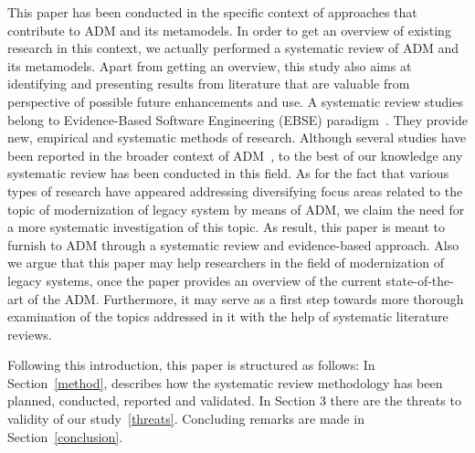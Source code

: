 This paper has been conducted in the specific context of approaches that contribute to ADM and its metamodels. In order to get an overview of existing research in this context, we actually performed a systematic review of ADM and its metamodels. Apart from getting an overview, this study also aims at identifying and presenting results from literature that are valuable from perspective of possible future enhancements and use. A systematic review studies belong to Evidence-Based Software Engineering (EBSE) paradigm~\cite{Kitchenham}. They provide new, empirical and systematic methods of research. Although several studies have been reported in the broader context of ADM~\cite{PerezCastillo20121370, SMR:SMR582, FuentesFernandez2012247, PrezCastillo2011519}, to the best of our knowledge any systematic review has been conducted in this field. As for the fact that various types of research have appeared addressing diversifying focus areas related to the topic of modernization of legacy system by means of ADM, we claim the need for a more systematic investigation of this topic. As result, this paper is meant to furnish to ADM through a systematic review and evidence-based approach. Also we argue that this paper may help researchers in the field of modernization of legacy systems, once the paper provides an overview of the current state-of-the-art of the ADM. Furthermore, it may serve as a first step towards more thorough examination of the topics addressed in it with the help of systematic literature reviews.

Following this introduction, this paper is structured as follows: In Section~\ref{method}, describes how the systematic review methodology has been planned, conducted, reported and validated. In Section 3 there are the threats to validity of our study~\ref{threats}. Concluding remarks are made in Section~\ref{conclusion}.